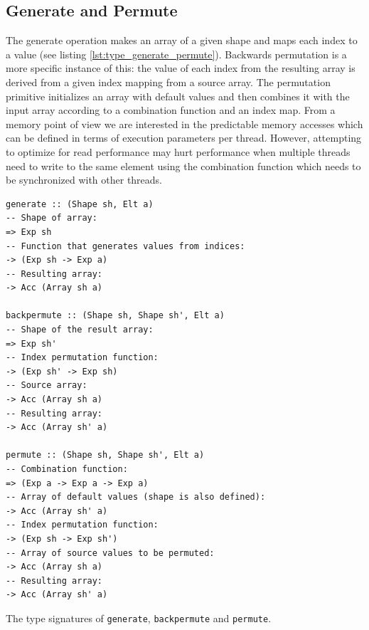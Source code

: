 \documentclass{article}
\begin{document}
\subsection{Generate and Permute}
The generate operation makes an array of a given shape and maps each index to a value (see listing \ref{lst:type_generate_permute}).
Backwards permutation is a more specific instance of this: the value of each index from the resulting array is derived from a given index mapping from a source array.
The permutation primitive initializes an array with default values and then combines it with the input array according to a combination function and an index map.
From a memory point of view we are interested in the predictable memory accesses which can be defined in terms of execution parameters per thread.
However, attempting to optimize for read performance may hurt performance when multiple threads need to write to the same element using the combination function which needs to be synchronized with other threads.
\begin{listing}[!ht]
    \begin{verbatim}
generate :: (Shape sh, Elt a) 
-- Shape of array:
=> Exp sh 
-- Function that generates values from indices:
-> (Exp sh -> Exp a) 
-- Resulting array:
-> Acc (Array sh a) 

backpermute :: (Shape sh, Shape sh', Elt a)	 
-- Shape of the result array:
=> Exp sh'	
-- Index permutation function:
-> (Exp sh' -> Exp sh)	
-- Source array:
-> Acc (Array sh a)	
-- Resulting array:
-> Acc (Array sh' a)

permute :: (Shape sh, Shape sh', Elt a) 
-- Combination function:
=> (Exp a -> Exp a -> Exp a)	
-- Array of default values (shape is also defined):
-> Acc (Array sh' a)	
-- Index permutation function:
-> (Exp sh -> Exp sh')	
-- Array of source values to be permuted:
-> Acc (Array sh a)	
-- Resulting array:
-> Acc (Array sh' a)
    \end{verbatim}
    \caption{
        The type signatures of \texttt{generate}, \texttt{backpermute} and \texttt{permute}.
    }
    \label{lst:type_generate_permute}
\end{listing}
\end{document}
